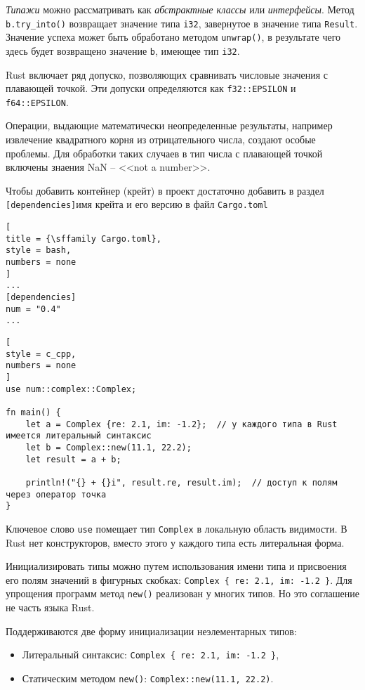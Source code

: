 \documentclass[%
	11pt,
	a4paper,
	utf8,
		]{article}
\begin{document}
\emph{Типажи} можно рассматривать как \emph{абстрактные классы} или \emph{интерфейсы}. Метод \verb|b.try_into()| возвращает значение типа \verb|i32|, завернутое в значение типа \texttt{Result}. Значение успеха может быть обработано методом \verb|unwrap()|, в результате чего здесь будет возвращено значение \texttt{b}, имеющее тип \verb|i32|.

Rust включает ряд допуско, позволяющих сравнивать числовые значения с плавающей точкой. Эти допуски определяются как \verb|f32::EPSILON| и \verb|f64::EPSILON|.

Операции, выдающие математически неопределенные результаты, например извлечение квадратного корня из отрицательного числа, создают особые проблемы. Для обработки таких случаев в тип числа с плавающей точкой включены знаения NaN -- <<not a number>>.

Чтобы добавить контейнер (крейт) в проект достаточно добавить в раздел \texttt{[dependencies]}имя крейта и его версию в файл \texttt{Cargo.toml}
\begin{lstlisting}[
title = {\sffamily Cargo.toml},
style = bash,
numbers = none
]
...
[dependencies]
num = "0.4"
...
\end{lstlisting}

\begin{lstlisting}[
style = c_cpp,
numbers = none
]
use num::complex::Complex;

fn main() {
    let a = Complex {re: 2.1, im: -1.2};  // у каждого типа в Rust имеется литеральный синтаксис
    let b = Complex::new(11.1, 22.2);
    let result = a + b;
    
    println!("{} + {}i", result.re, result.im);  // доступ к полям через оператор точка
}
\end{lstlisting}

Ключевое слово \texttt{use} помещает тип \texttt{Complex} в локальную область видимости. В Rust нет конструкторов, вместо этого у каждого типа есть литеральная форма.

Инициализировать типы можно путем использования имени типа и присвоения его полям значений в фигурных скобках: \verb|Complex { re: 2.1, im: -1.2 }|. Для упрощения программ метод \verb|new()| реализован у многих типов. Но это соглашение не часть языка Rust.

Поддерживаются две форму инициализации неэлементарных типов:
\begin{itemize}
	\item Литеральный синтаксис: \verb|Complex { re: 2.1, im: -1.2 }|,
	
	\item Статическим методом \verb|new()|: \verb|Complex::new(11.1, 22.2)|.
\end{itemize}
\end{document}
